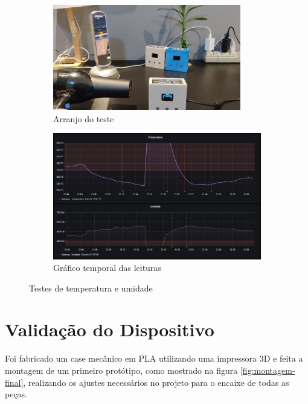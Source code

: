 \documentclass[../monografia.tex]{subfiles}
\begin{document}
\begin{figure}[h]
\centering
	\begin{subfigure}{0.5\textwidth}
		\centering
		\includegraphics[width=0.9\textwidth]{teste-secador}
		\caption{Arranjo do teste}
		\label{fig:arranjo-luz}
	\end{subfigure}%
	\begin{subfigure}{0.5\textwidth}
		\centering
		\includegraphics[width=\textwidth]{dashboard-temperatura}
		\caption{Gráfico temporal das leituras}
		\label{fig:dash-luz}
	\end{subfigure}
	\caption{Testes de temperatura e umidade}
	\label{fig:teste-sgp30}
\end{figure}

\section{Validação do Dispositivo} %

Foi fabricado um case mecânico em PLA utilizando uma impressora 3D e feita a montagem de um primeiro protótipo, como mostrado na figura \ref{fig:montagem-final}, realizando os ajustes necessários no projeto para o encaixe de todas as peças. 
\end{document}

